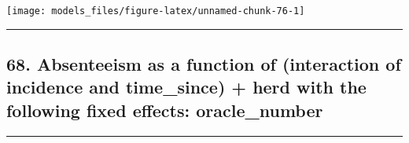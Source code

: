 \documentclass[]{article}
\begin{document}
\begin{center}\texttt{[image: models\_files/figure-latex/unnamed-chunk-76-1]} \end{center}

\newpage

\begin{center}\rule{0.5\linewidth}{\linethickness}\end{center}

\subsection{68. Absenteeism as a function of (interaction of incidence
and time\_since) + herd with the following fixed effects:
oracle\_number}\label{absenteeism-as-a-function-of-interaction-of-incidence-and-time_since-herd-with-the-following-fixed-effects-oracle_number-1}

\begin{center}\rule{0.5\linewidth}{\linethickness}\end{center}
\end{document}
